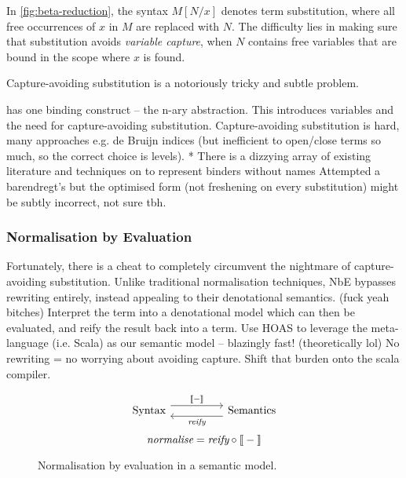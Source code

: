 \documentclass[../../main.tex]{subfiles}
\begin{document}
In \cref{fig:beta-reduction}, the syntax $M[N/x]$ denotes term substitution, where all free occurrences of $x$ in $M$ are replaced with $N$.
The difficulty lies in making sure that substitution avoids \emph{variable capture}, when $N$ contains free variables that are bound in the scope where $x$ is found.

Capture-avoiding substitution is a notoriously tricky and subtle problem.

 has one binding construct -- the n-ary abstraction. This introduces variables and the need for capture-avoiding substitution.
Capture-avoiding substitution is hard, many approaches e.g. de Bruijn indices (but inefficient to open/close terms so much, so the correct choice is levels).
* There is a dizzying array of existing literature and techniques on to represent binders without names
Attempted a barendregt's but the optimised form (not freshening on every substitution) might be subtly incorrect, not sure tbh.

\subsubsection{Normalisation by Evaluation}
Fortunately, there is a cheat to completely circumvent the nightmare of capture-avoiding substitution.
Unlike traditional normalisation techniques, NbE bypasses rewriting entirely, instead appealing to their denotational semantics. (fuck yeah bitches)
Interpret the term into a denotational model which can then be evaluated, and reify the result back into a term.
Use HOAS to leverage the meta-language (i.e. Scala) as our semantic model -- blazingly fast! (theoretically lol)
No rewriting = no worrying about avoiding capture.
Shift that burden onto the scala compiler.

\begin{figure}
\begin{equation*}
\begin{tikzcd}
  \text{Syntax} \arrow[rr, "\text{\textlbrackdbl} - \text{\textrbrackdbl}", shift left=2] &  & \text{Semantics} \arrow[ll, "\textit{reify}", shift left=2]
\end{tikzcd}
\end{equation*}
\vspace{0.5ex}
\begin{equation*}
\textit{normalise} = \textit{reify} \circ \text{\textlbrackdbl} - \text{\textrbrackdbl}
\end{equation*}
\caption{Normalisation by evaluation in a semantic model.}
\end{figure}
\end{document}
